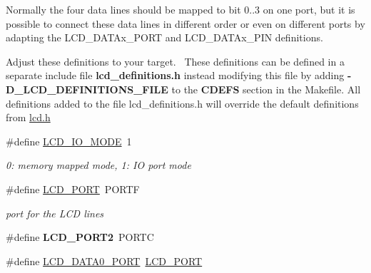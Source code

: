 Normally the four data lines should be mapped to bit 0..3 on one port, but it is possible to connect these data lines in different order or even on different ports by adapting the L\+C\+D\+\_\+\+D\+A\+T\+Ax\+\_\+\+P\+O\+RT and L\+C\+D\+\_\+\+D\+A\+T\+Ax\+\_\+\+P\+IN definitions.

Adjust these definitions to your target.~\newline
 These definitions can be defined in a separate include file {\bfseries lcd\+\_\+definitions.\+h} instead modifying this file by adding {\bfseries -\/\+D\+\_\+\+L\+C\+D\+\_\+\+D\+E\+F\+I\+N\+I\+T\+I\+O\+N\+S\+\_\+\+F\+I\+LE} to the {\bfseries C\+D\+E\+FS} section in the Makefile. All definitions added to the file lcd\+\_\+definitions.\+h will override the default definitions from \hyperlink{lcd_8h}{lcd.\+h} \begin{DoxyCompactItemize}
\item 
\#define \hyperlink{group__pfleury__lcd_ga659fcdf979f69bbd14f852f525f25e02}{L\+C\+D\+\_\+\+I\+O\+\_\+\+M\+O\+DE}~1\hypertarget{group__pfleury__lcd_ga659fcdf979f69bbd14f852f525f25e02}{}\label{group__pfleury__lcd_ga659fcdf979f69bbd14f852f525f25e02}

\begin{DoxyCompactList}\small\item\em 0\+: memory mapped mode, 1\+: IO port mode \end{DoxyCompactList}\item 
\#define \hyperlink{group__pfleury__lcd_gabcf42bd88b3c36193f301ca25b033875}{L\+C\+D\+\_\+\+P\+O\+RT}~P\+O\+R\+TF\hypertarget{group__pfleury__lcd_gabcf42bd88b3c36193f301ca25b033875}{}\label{group__pfleury__lcd_gabcf42bd88b3c36193f301ca25b033875}

\begin{DoxyCompactList}\small\item\em port for the L\+CD lines \end{DoxyCompactList}\item 
\#define {\bfseries L\+C\+D\+\_\+\+P\+O\+R\+T2}~P\+O\+R\+TC\hypertarget{group__pfleury__lcd_ga059611140ef5a510e16f43da4421be37}{}\label{group__pfleury__lcd_ga059611140ef5a510e16f43da4421be37}

\item 
\#define \hyperlink{group__pfleury__lcd_gafc0acd4774bcd311595732f5367e266b}{L\+C\+D\+\_\+\+D\+A\+T\+A0\+\_\+\+P\+O\+RT}~\hyperlink{group__pfleury__lcd_gabcf42bd88b3c36193f301ca25b033875}{L\+C\+D\+\_\+\+P\+O\+RT}\hypertarget{group__pfleury__lcd_gafc0acd4774bcd311595732f5367e266b}{}\label{group__pfleury__lcd_gafc0acd4774bcd311595732f5367e266b}


\end{DoxyCompactItemize}
